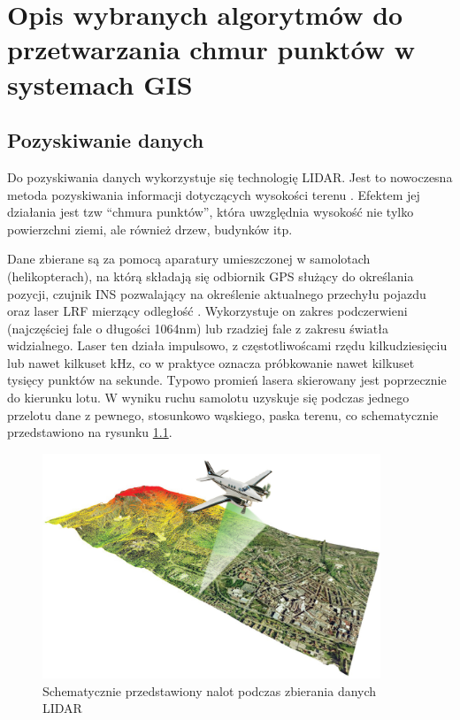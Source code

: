 \chapter{Opis wybranych algorytmów do przetwarzania chmur punktów w systemach GIS}

\section{Pozyskiwanie danych}
Do pozyskiwania danych wykorzystuje się technologię LIDAR. Jest to nowoczesna metoda pozyskiwania informacji dotyczących wysokości terenu \cite{Marmol2003}.
Efektem jej działania jest tzw “chmura punktów”, która uwzględnia wysokość nie tylko powierzchni ziemi, ale również drzew, budynków itp.

Dane zbierane są za pomocą aparatury umieszczonej w samolotach (helikopterach), na którą składają się odbiornik GPS służący do określania
pozycji, czujnik INS pozwalający na określenie aktualnego przechyłu pojazdu oraz laser
LRF mierzący odległość \cite{WBPW2012}. Wykorzystuje on zakres podczerwieni (najczęściej fale o długości 1064nm) lub rzadziej fale z zakresu
światła widzialnego. Laser ten działa impulsowo, z częstotliwoścami rzędu kilkudziesięciu lub nawet kilkuset kHz, co w praktyce oznacza
próbkowanie nawet kilkuset tysięcy punktów na sekunde. Typowo promień lasera skierowany jest poprzecznie do kierunku lotu. W wyniku ruchu samolotu
uzyskuje się podczas jednego przelotu dane z pewnego, stosunkowo wąskiego, paska terenu, co schematycznie przedstawiono na rysunku \ref{fig:lidar}.

\begin{figure}[h!]
\centering
\includegraphics[width=0.9\textwidth]{img/LIDAR.jpg}
\caption{Schematycznie przedstawiony nalot podczas zbierania danych LIDAR}
\label{fig:lidar}
\end{figure}

